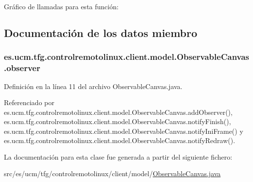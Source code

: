 Gráfico de llamadas para esta función\-:




\subsection{Documentación de los datos miembro}
\hypertarget{classes_1_1ucm_1_1tfg_1_1controlremotolinux_1_1client_1_1model_1_1ObservableCanvas_a04d29b541c5c02544c43d955b113c3c8}{
\subsubsection[{observer}]{ es.\-ucm.\-tfg.\-controlremotolinux.\-client.\-model.\-Observable\-Canvas.\-observer\hspace{0.3cm}{\ttfamily [private]}}}\label{classes_1_1ucm_1_1tfg_1_1controlremotolinux_1_1client_1_1model_1_1ObservableCanvas_a04d29b541c5c02544c43d955b113c3c8}


Definición en la línea 11 del archivo Observable\-Canvas.\-java.



Referenciado por es.\-ucm.\-tfg.\-controlremotolinux.\-client.\-model.\-Observable\-Canvas.\-add\-Observer(), es.\-ucm.\-tfg.\-controlremotolinux.\-client.\-model.\-Observable\-Canvas.\-notify\-Finish(), es.\-ucm.\-tfg.\-controlremotolinux.\-client.\-model.\-Observable\-Canvas.\-notify\-Ini\-Frame() y es.\-ucm.\-tfg.\-controlremotolinux.\-client.\-model.\-Observable\-Canvas.\-notify\-Redraw().



La documentación para esta clase fue generada a partir del siguiente fichero\-:\begin{DoxyCompactItemize}
\item 
src/es/ucm/tfg/controlremotolinux/client/model/\hyperlink{ObservableCanvas_8java}{Observable\-Canvas.\-java}\end{DoxyCompactItemize}
